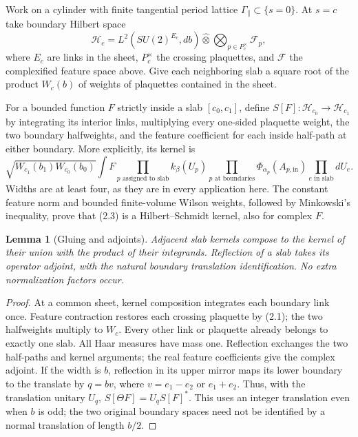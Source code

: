 \documentclass[11pt]{article}
\newtheorem{lemma}[theorem]{Lemma}
\theoremstyle{remark}
\begin{document}
Work on a cylinder with finite tangential period lattice
$\Gamma_\parallel\subset\{s=0\}$. At $s=c$ take boundary Hilbert space
\[
 \mathcal H_c=L^2(SU(2)^{E_c},db)
       \widehat\otimes\bigotimes_{p\in P_c^\times}\mathcal F_p,
 \tag{2.2}
\]
where $E_c$ are links in the sheet, $P_c^\times$ the crossing
plaquettes, and $\mathcal F$ the complexified feature space above.
Give each neighboring slab a square root of the product $W_c(b)$
of weights of plaquettes contained in the sheet.

For a bounded function $F$ strictly inside a slab $[c_0,c_1]$,
define $S[F]:\mathcal H_{c_0}\to\mathcal H_{c_1}$ by integrating
its interior links, multiplying every one-sided plaquette weight,
the two boundary halfweights, and the feature coefficient for each
inside half-path at either boundary. More explicitly, its kernel is
\[
 \sqrt{W_{c_1}(b_1)W_{c_0}(b_0)}
 \int F\prod_{p\text{ assigned to slab}}k_\beta(U_p)
       \prod_{p\text{ at boundaries}}\Phi_{\alpha_p}(A_{p,\mathrm{in}})
       \prod_{e\text{ in slab}}dU_e.
 \tag{2.3}
\]
Widths are at least four, as they are in every application here.
The constant feature norm and bounded finite-volume Wilson weights,
followed by Minkowski's inequality, prove that (2.3) is a
Hilbert--Schmidt kernel, also for complex $F$.

\begin{lemma}[Gluing and adjoints]\label{lem:glue}
Adjacent slab kernels compose to the kernel of their union with the
product of their integrands. Reflection of a slab takes its operator
adjoint, with the natural boundary translation identification.
No extra normalization factors occur.
\end{lemma}
\begin{proof}
At a common sheet, kernel composition integrates each boundary link
once. Feature contraction restores each crossing plaquette by (2.1);
the two halfweights multiply to $W_c$. Every other link or plaquette
already belongs to exactly one slab. All Haar measures have mass one.
Reflection exchanges the two half-paths and kernel arguments;
the real feature coefficients give the complex adjoint.
If the width is $b$, reflection in its upper mirror maps its lower
boundary to the translate by $q=bv$, where $v=e_1-e_2$ or $e_1+e_2$.
Thus, with the translation unitary $U_q$,
$S[\Theta F]=U_qS[F]^*$. This uses an integer translation even
when $b$ is odd; the two original boundary spaces need not be
identified by a normal translation of length $b/2$.
\end{proof}
\end{document}
